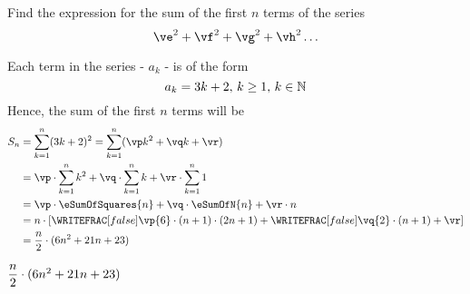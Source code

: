 

\EXPR[0]\ve{\va + \vb}
\EXPR[0]
\EXPR[0]
\EXPR[0]

\SQUARE\va\vp
\EXPR[0]
\SQUARE\vb\vr

\question[3] Find the expression for the sum of the first $n$ terms of the series 
 \[ \ve^2 + \vf^2 + \vg^2 + \vh^2 \ldots \]

\watchout

\begin{solution}[\halfpage]
	Each term in the series - $a_k$ - is of the form
  \[ a_k = 3 k + 2,\, k\geq 1,\, k\in\mathbb{N} \]
  Hence, the sum of the first $n$ terms will be 
	\begin{align}
		S_n &= \sum_{k=1}^{n}(\va k + \vb)^2 = \sum_{k=1}^{n} (\vp k^2 + \vq k + \vr)\\
		&= \vp\cdot\sum_{k=1}^{n}k^2 + \vq\cdot\sum_{k=1}^{n}k + \vr\cdot\sum_{k=1}^{n}1 \\
		&= \vp\cdot\eSumOfSquares{n} + \vq\cdot\eSumOfN{n} + \vr\cdot n \\
    &= n\cdot\left[ \WRITEFRAC[false]\vp{6}\cdot (n+1)\cdot (2n+1) 
    + \WRITEFRAC[false]\vq{2}\cdot (n+1) + \vr \right]\\
    &= \vz
	\end{align}
\end{solution}
\ifprintanswers\begin{codex}$\dfrac{n}{2}\cdot (6n^2 + 21n + 23)$\end{codex}\fi
